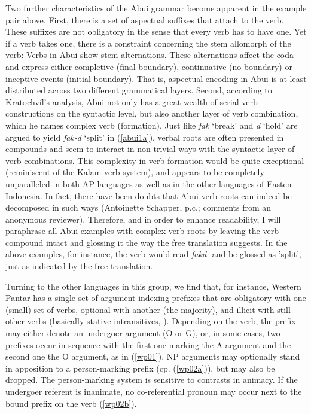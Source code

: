 Two further characteristics of the Abui grammar become apparent in the example pair above. First, there is a set of aspectual suffixes that attach to the verb. These suffixes are not obligatory in the sense that every verb has to have one. Yet if a verb takes one, there is a constraint concerning the stem allomorph of the verb: Verbs in Abui show stem alternations. These alternations affect the coda and express either completive (final boundary), continuative (no boundary) or inceptive events (initial boundary). That is, aspectual encoding in Abui is at least distributed across two different grammatical layers. Second, according to Kratochvíl's analysis, Abui not only has a great wealth of serial-verb constructions on the syntactic level, but also another layer of verb combination, which he names complex verb (formation). Just like \textit{fak} `break' and \textit{d} `hold' are argued to yield \textit{fak-d} `split' in (\ref{abui1a}), verbal roots are often presented in compounds and seem to interact in non-trivial ways with the syntactic layer of verb combinations. This complexity in verb formation would be quite exceptional (reminiscent of the Kalam verb system), and appears to be completely unparalleled in both AP languages as well as in the other languages of Easten Indonesia. In fact, there have been doubts that Abui verb roots can indeed be decomposed in such ways (Antoinette Schapper, p.c.;  comments from an anonymous reviewer). Therefore, and in order to enhance readability, I will paraphrase all Abui examples with complex verb roots by leaving the verb compound intact and glossing it the way the free translation suggests. In the above examples, for instance, the verb would read \textit{fakd-} and be glossed as 'split', just as indicated by the free translation.

Turning to the other languages in this group, we find that, for instance, Western Pantar has a single set of argument indexing prefixes that are obligatory with one (small) set of verbs, optional with another (the majority), and illicit with still other verbs (basically stative intransitives, \citealt[76]{holton2014western}). Depending on the verb, the prefix may either denote an undergoer argument (O or G), or, in some cases, two prefixes occur in sequence with the first one marking the A argument and the second one the O argument, as in (\ref{wp01}). NP arguments may optionally stand in apposition to a person-marking prefix (cp. (\ref{wp02a})), but may also be dropped. The person-marking system is sensitive to contrasts in animacy. If the undergoer referent is inanimate, no co-referential pronoun may occur next to the bound prefix on the verb (\ref{wp02b}).


